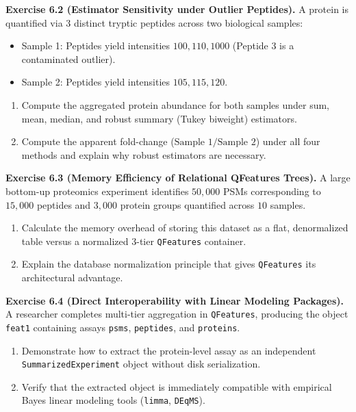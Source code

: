 \documentclass[11pt,twoside,openright]{book}
\begin{document}
\vspace{0.8em}
\noindent\textbf{Exercise 6.2 (Estimator Sensitivity under Outlier Peptides).}\enspace
\label{ex:estimator_sensitivity}
A protein is quantified via 3 distinct tryptic peptides across two biological samples:
\begin{itemize}
    \item Sample 1: Peptides yield intensities $100, 110, 1000$ (Peptide 3 is a contaminated outlier).
    \item Sample 2: Peptides yield intensities $105, 115, 120$.
\end{itemize}
\begin{enumerate}
    \item Compute the aggregated protein abundance for both samples under sum, mean, median, and robust summary (Tukey biweight) estimators.
    \item Compute the apparent fold-change ($\text{Sample 1} / \text{Sample 2}$) under all four methods and explain why robust estimators are necessary.
\end{enumerate}

\vspace{0.8em}
\noindent\textbf{Exercise 6.3 (Memory Efficiency of Relational QFeatures Trees).}\enspace
\label{ex:memory_efficiency_qfeatures}
A large bottom-up proteomics experiment identifies $50,000$ PSMs corresponding to $15,000$ peptides and $3,000$ protein groups quantified across $10$ samples.
\begin{enumerate}
    \item Calculate the memory overhead of storing this dataset as a flat, denormalized table versus a normalized 3-tier \texttt{QFeatures} container.
    \item Explain the database normalization principle that gives \texttt{QFeatures} its architectural advantage.
\end{enumerate}

\vspace{0.8em}
\noindent\textbf{Exercise 6.4 (Direct Interoperability with Linear Modeling Packages).}\enspace
\label{ex:interoperability_modeling}
A researcher completes multi-tier aggregation in \texttt{QFeatures}, producing the object \texttt{feat1} containing assays \texttt{psms}, \texttt{peptides}, and \texttt{proteins}.
\begin{enumerate}
    \item Demonstrate how to extract the protein-level assay as an independent \texttt{SummarizedExperiment} object without disk serialization.
    \item Verify that the extracted object is immediately compatible with empirical Bayes linear modeling tools (\texttt{limma}, \texttt{DEqMS}).
\end{enumerate}
\end{document}
